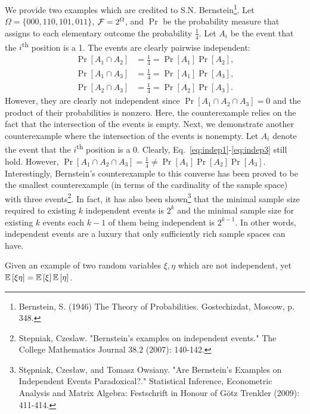 \begin{solution}
    We provide two examples which are credited to S.N. Bernstein\footnote{Bernstein, S. (1946) The Theory of Probabilities. Gostechizdat, Moscow, p. 348.}. Let $\Omega = \{000, 110, 101, 011\}$, $\mathcal{F} = 2^\Omega$, and $\Pr$ be the probability measure that assigns to each elementary outcome the probability $\frac{1}{4}$. Let $A_i$ be the event that the $i$\textsuperscript{th} position is a 1. The events are clearly pairwise independent:
    \begin{align}
        \Pr[A_1 \cap A_2] &= \frac{1}{4} = \Pr[A_1]\Pr[A_2], \label{eq:indep1}\\
        \Pr[A_1 \cap A_3] &= \frac{1}{4} = \Pr[A_1]\Pr[A_3], \label{eq:indep2}\\
        \Pr[A_2 \cap A_3] &= \frac{1}{4} = \Pr[A_2]\Pr[A_3]. \label{eq:indep3}
    \end{align}
    However, they are clearly not independent since $\Pr[A_1\cap A_2\cap A_3] = 0$ and the product of their probabilities is nonzero. Here, the counterexample relies on the fact that the intersection of the events is empty. Next, we demonstrate another counterexample where the intersection of the events is nonempty. Let $A_i$ denote the event that the $i$\textsuperscript{th} position is a 0. Clearly, Eq.~\ref{eq:indep1}-\ref{eq:indep3} still hold. However, $\Pr[A_1 \cap A_2 \cap A_3] = \frac{1}{4} \neq \Pr[A_1]\Pr[A_2]\Pr[A_3]$. 
    Interestingly, Bernstein's counterexample to this converse has been proved to be the smallest counterexample (in terms of the cardinality of the sample space) with three events\footnote{Stepniak, Czeslaw. "Bernstein's examples on independent events." The College Mathematics Journal 38.2 (2007): 140-142.}. In fact, it has also been shown\footnote{Stępniak, Czesław, and Tomasz Owsiany. "Are Bernstein's Examples on Independent Events Paradoxical?." Statistical Inference, Econometric Analysis and Matrix Algebra: Festschrift in Honour of Götz Trenkler (2009): 411-414.} that the minimal sample size required to existing $k$ independent events is $2^k$ and the minimal sample size for existing $k$ events each $k-1$ of them being independent is $2^{k-1}$. In other words, independent events are a luxury that only sufficiently rich sample spaces can have. 
\end{solution}
\begin{problem}{6}
    Given an example of two random variables $\xi, \eta$ which are not independent, yet $\mathbb{E}\left[\xi\eta\right] = \mathbb{E}\left[\xi\right]\mathbb{E}\left[\eta\right]$. 
\end{problem}
